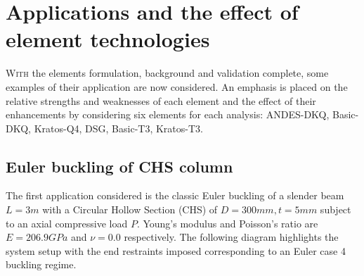 



\chapter{Applications and the effect of element technologies}
\label{chap:chapter_application}

\renewcommand{\Thema}{Applications and the effect of element technologies}

\lettrine[lines=2]{W}{ith} the elements formulation, background and validation complete, some examples of their application are now considered. An emphasis is placed on the relative strengths and weaknesses of each element and the effect of their enhancements by considering six elements for each analysis: ANDES-DKQ, Basic-DKQ, Kratos-Q4, DSG, Basic-T3, Kratos-T3.

\section{Euler buckling of CHS column}
\label{applications: Euler buckling of CHS column}
The first application considered is the classic Euler buckling of a slender beam $L=3m$ with a Circular Hollow Section (CHS) of $D = 300mm, t = 5mm$ subject to an axial compressive load $P$. Young's modulus and Poisson's ratio are $E = 206.9GPa$ and $\nu = 0.0$ respectively. The following diagram highlights the system setup with the end restraints imposed corresponding to an Euler case 4 buckling regime. 

